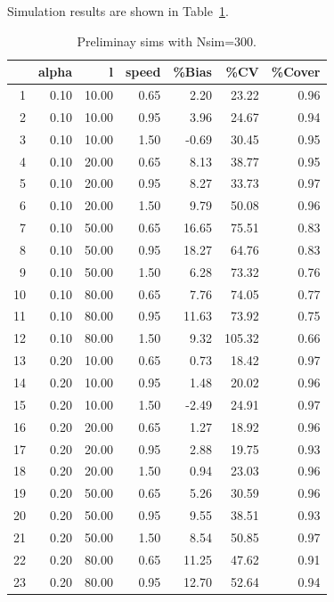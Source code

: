 \documentclass[useAMS, usenatbib, referee]{biom}\usepackage[]{graphicx}\usepackage[]{color}
\begin{document}
Simulation results are shown in Table~\ref{tab:mlesims}.

\begin{table}[ht]
\centering
\caption{Preliminay sims with Nsim=300.} 
\label{tab:mlesims}
\begin{tabular}{rrrrrrr}
  \hline
 & alpha & l & speed & \%Bias & \%CV & \%Cover \\ 
  \hline
1 & 0.10 & 10.00 & 0.65 & 2.20 & 23.22 & 0.96 \\ 
  2 & 0.10 & 10.00 & 0.95 & 3.96 & 24.67 & 0.94 \\ 
  3 & 0.10 & 10.00 & 1.50 & -0.69 & 30.45 & 0.95 \\ 
  4 & 0.10 & 20.00 & 0.65 & 8.13 & 38.77 & 0.95 \\ 
  5 & 0.10 & 20.00 & 0.95 & 8.27 & 33.73 & 0.97 \\ 
  6 & 0.10 & 20.00 & 1.50 & 9.79 & 50.08 & 0.96 \\ 
  7 & 0.10 & 50.00 & 0.65 & 16.65 & 75.51 & 0.83 \\ 
  8 & 0.10 & 50.00 & 0.95 & 18.27 & 64.76 & 0.83 \\ 
  9 & 0.10 & 50.00 & 1.50 & 6.28 & 73.32 & 0.76 \\ 
  10 & 0.10 & 80.00 & 0.65 & 7.76 & 74.05 & 0.77 \\ 
  11 & 0.10 & 80.00 & 0.95 & 11.63 & 73.92 & 0.75 \\ 
  12 & 0.10 & 80.00 & 1.50 & 9.32 & 105.32 & 0.66 \\ 
  13 & 0.20 & 10.00 & 0.65 & 0.73 & 18.42 & 0.97 \\ 
  14 & 0.20 & 10.00 & 0.95 & 1.48 & 20.02 & 0.96 \\ 
  15 & 0.20 & 10.00 & 1.50 & -2.49 & 24.91 & 0.97 \\ 
  16 & 0.20 & 20.00 & 0.65 & 1.27 & 18.92 & 0.96 \\ 
  17 & 0.20 & 20.00 & 0.95 & 2.88 & 19.75 & 0.93 \\ 
  18 & 0.20 & 20.00 & 1.50 & 0.94 & 23.03 & 0.96 \\ 
  19 & 0.20 & 50.00 & 0.65 & 5.26 & 30.59 & 0.96 \\ 
  20 & 0.20 & 50.00 & 0.95 & 9.55 & 38.51 & 0.93 \\ 
  21 & 0.20 & 50.00 & 1.50 & 8.54 & 50.85 & 0.97 \\ 
  22 & 0.20 & 80.00 & 0.65 & 11.25 & 47.62 & 0.91 \\ 
  23 & 0.20 & 80.00 & 0.95 & 12.70 & 52.64 & 0.94 \\ 

\end{tabular}
\end{table}
\end{document}
